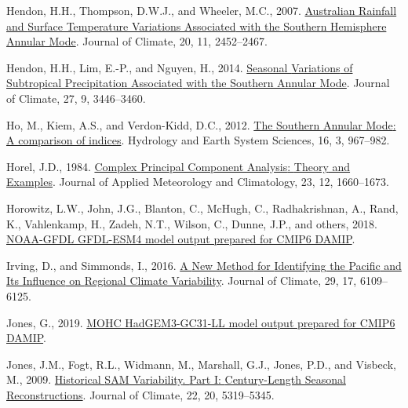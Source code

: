 \documentclass[12pt,oneside]{reedthesis}
\newlength{\cslhangindent}
\newenvironment{CSLReferences}[2] %
 {%
  \setlength{\parindent}{0pt}
  \ifodd #1 \everypar{\setlength{\hangindent}{\cslhangindent}}\ignorespaces\fi
  \ifnum #2 > 0
  \setlength{\parskip}{#2\baselineskip}
  \fi
 }%
 {}
\begin{document}
\begin{CSLReferences}{1}{0}
\leavevmode{}%
Hendon, H.H., Thompson, D.W.J., and Wheeler, M.C., 2007. \href{https://doi.org/10.1175/JCLI4134.1}{Australian {Rainfall} and {Surface Temperature Variations Associated} with the {Southern Hemisphere Annular Mode}}. Journal of Climate, 20, 11, 2452--2467.

\leavevmode{}%
Hendon, H.H., Lim, E.-P., and Nguyen, H., 2014. \href{https://doi.org/10.1175/JCLI-D-13-00550.1}{Seasonal {Variations} of {Subtropical Precipitation Associated} with the {Southern Annular Mode}}. Journal of Climate, 27, 9, 3446--3460.

\leavevmode{}%
Ho, M., Kiem, A.S., and Verdon-Kidd, D.C., 2012. \href{https://doi.org/10.5194/hess-16-967-2012}{The {Southern Annular Mode}: A comparison of indices}. Hydrology and Earth System Sciences, 16, 3, 967--982.

\leavevmode{}%
Horel, J.D., 1984. \href{https://doi.org/10.1175/1520-0450(1984)023\%3C1660:CPCATA\%3E2.0.CO;2}{Complex {Principal Component Analysis}: {Theory} and {Examples}}. Journal of Applied Meteorology and Climatology, 23, 12, 1660--1673.

\leavevmode{}%
Horowitz, L.W., John, J.G., Blanton, C., McHugh, C., Radhakrishnan, A., Rand, K., Vahlenkamp, H., Zadeh, N.T., Wilson, C., Dunne, J.P., and others, 2018. \href{https://doi.org/10.22033/ESGF/CMIP6.1408}{NOAA-GFDL GFDL-ESM4 model output prepared for CMIP6 DAMIP}.

\leavevmode{}%
Irving, D., and Simmonds, I., 2016. \href{https://doi.org/10.1175/JCLI-D-15-0843.1}{A {New Method} for {Identifying} the {Pacific} and {Its Influence} on {Regional Climate Variability}}. Journal of Climate, 29, 17, 6109--6125.

\leavevmode{}%
Jones, G., 2019. \href{https://doi.org/10.22033/ESGF/CMIP6.471}{MOHC HadGEM3-GC31-LL model output prepared for CMIP6 DAMIP}.

\leavevmode{}%
Jones, J.M., Fogt, R.L., Widmann, M., Marshall, G.J., Jones, P.D., and Visbeck, M., 2009. \href{https://doi.org/10.1175/2009JCLI2785.1}{Historical {SAM Variability}. {Part I}: {Century-Length Seasonal Reconstructions}}. Journal of Climate, 22, 20, 5319--5345.


\end{CSLReferences}
\end{document}
